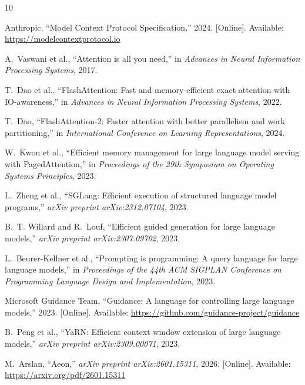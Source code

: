 \documentclass[conference,10pt]{IEEEtran}
\begin{document}
\balance
\begin{thebibliography}{10}

Anthropic, ``Model Context Protocol Specification,'' 2024. [Online]. Available: \url{https://modelcontextprotocol.io}

A.~Vaswani et al., ``Attention is all you need,'' in \emph{Advances in Neural Information Processing Systems}, 2017.

T.~Dao et al., ``FlashAttention: Fast and memory-efficient exact attention with IO-awareness,'' in \emph{Advances in Neural Information Processing Systems}, 2022.

T.~Dao, ``FlashAttention-2: Faster attention with better parallelism and work partitioning,'' in \emph{International Conference on Learning Representations}, 2024.

W.~Kwon et al., ``Efficient memory management for large language model serving with PagedAttention,'' in \emph{Proceedings of the 29th Symposium on Operating Systems Principles}, 2023.

L.~Zheng et al., ``SGLang: Efficient execution of structured language model programs,'' \emph{arXiv preprint arXiv:2312.07104}, 2023.

B.~T. Willard and R.~Louf, ``Efficient guided generation for large language models,'' \emph{arXiv preprint arXiv:2307.09702}, 2023.

L.~Beurer-Kellner et al., ``Prompting is programming: A query language for large language models,'' in \emph{Proceedings of the 44th ACM SIGPLAN Conference on Programming Language Design and Implementation}, 2023.

Microsoft Guidance Team, ``Guidance: A language for controlling large language models,'' 2023. [Online]. Available: \url{https://github.com/guidance-project/guidance}

B.~Peng et al., ``YaRN: Efficient context window extension of large language models,'' \emph{arXiv preprint arXiv:2309.00071}, 2023.

M.~Arslan, ``Aeon,'' \emph{arXiv preprint arXiv:2601.15311}, 2026. [Online]. Available: \url{https://arxiv.org/pdf/2601.15311}


\end{thebibliography}
\end{document}

